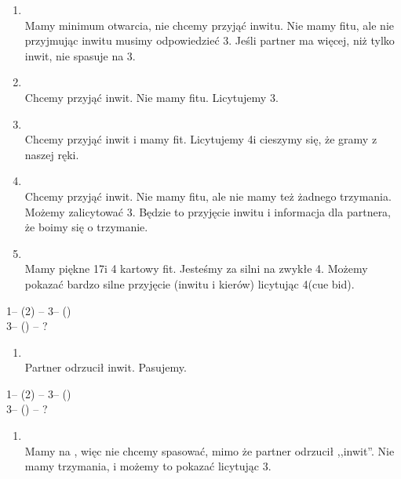 \documentclass[12pt, a4paper]{article}
\begin{document}
\begin{enumerate}
    \item
        \\
        Mamy minimum otwarcia, nie chcemy przyjąć inwitu. 
        Nie mamy fitu, ale nie przyjmując inwitu musimy 
        odpowiedzieć 3\hearts. Jeśli partner ma więcej,
        niż tylko inwit, nie spasuje na 3\hearts.
    \item
        \\
        Chcemy przyjąć inwit. Nie mamy fitu. Licytujemy 3\nt.
    \item
        \\
        Chcemy przyjąć inwit i mamy fit. Licytujemy 
        4\hearts i cieszymy się, że gramy z naszej ręki.
    \item
        \\
        Chcemy przyjąć inwit. Nie mamy fitu, ale nie mamy
        też żadnego trzymania. Możemy zalicytować 3\spades.
        Będzie to przyjęcie inwitu i informacja dla partnera,
        że boimy się o trzymanie.
    \item
        \\
        Mamy piękne 17\hcp i 4 kartowy fit. Jesteśmy
        za silni na zwykłe 4\hearts.
        Możemy pokazać bardzo silne przyjęcie (inwitu i kierów)
        licytując 4\clubs (cue bid).
\end{enumerate}

1\nt -- (2\hearts) -- 3\diams -- (\pass)\\
3\hearts -- (\pass) -- ?
\begin{enumerate}
    \item 
        \\
        Partner odrzucił inwit. Pasujemy.
\end{enumerate}

1\nt -- (2\hearts) -- 3\clubs -- (\pass)\\
3\diams -- (\pass) -- ?
\begin{enumerate}
    \item 
        \\
        Mamy na \gf, więc nie chcemy spasować, mimo że
        partner odrzucił ,,inwit''. Nie mamy trzymania, i możemy to pokazać
        licytując 3\hearts.
\end{enumerate}
\end{document}
